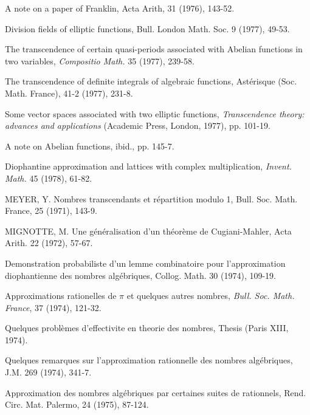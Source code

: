 \begin{hanglist}
    \item A note on a paper of Franklin, Acta Arith, 31 (1976), 143-52.
    \item Division fields of elliptic functions, Bull. London Math. Soc. 9 (1977), 49-53.
    \item The transcendence of certain quasi-periods associated with Abelian functions in two variables, \textit{Compositio Math.} 35 (1977), 239-58.
    \item The transcendence of definite integrals of algebraic functions, Astérisque (Soc. Math. France), 41-2 (1977), 231-8.
    \item Some vector spaces associated with two elliptic functions, \textit{Transcendence theory: advances and applications} (Academic Press, London, 1977), pp. 101-19.
    \item A note on Abelian functions, ibid., pp. 145-7.
    \item Diophantine approximation and lattices with complex multiplication, \textit{Invent. Math.} 45 (1978), 61-82.
    \item MEYER, Y. Nombres transcendants et répartition modulo 1, Bull. Soc. Math. France, 25 (1971), 143-9.
    \item MIGNOTTE, M. Une généralisation d'un théorème de Cugiani-Mahler, Acta Arith. 22 (1972), 57-67.
    \item \hspace{1.5em} Demonstration probabiliste d'un lemme combinatoire pour l'approximation diophantienne des nombres algébriques, Collog. Math. 30 (1974), 109-19.
    \item \hspace{1.5em} Approximations rationelles de  $\pi$  et quelques autres nombres, \textit{Bull. Soc. Math. France}, 37 (1974), 121-32.
    \item \hspace{1.5em} Quelques problèmes d'effectivite en theorie des nombres, Thesis (Paris XIII, 1974).
    \item \hspace{1.5em} Quelques remarques sur l'approximation rationnelle des nombres algébriques, J.M. 269 (1974), 341-7.
    \item \hspace{1.5em} Approximation des nombres algébriques par certaines suites de rationnels, Rend. Circ. Mat. Palermo, 24 (1975), 87-124.

\end{hanglist}
